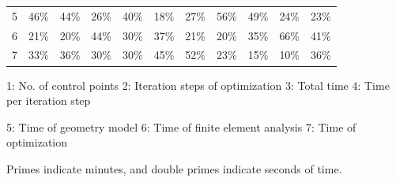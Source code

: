\documentclass[journal]{IEEEtran}
\theoremstyle{definition}
\begin{document}
\begin{table}[!t]
\begin{threeparttable}
\begin{tabular}{ccccccccccc}
      \normalsize{\textcircled{\scriptsize{5}}}\normalsize & 46\%                                & 44\%                                 & 26\%                                  & 40\%                          & 18\%                                 & 27\%                    & 56\%     & 49\%         & 24\%      & 23\%        \\
      \normalsize{\textcircled{\scriptsize{6}}}\normalsize & 21\%                                & 20\%                                 & 44\%                                  & 30\%                          & 37\%                                 & 21\%                    & 20\%     & 35\%         & 66\%      & 41\%        \\
      \normalsize{\textcircled{\scriptsize{7}}}\normalsize & 33\%                                & 36\%                                 & 30\%                                  & 30\%                          & 45\%                                 & 52\%                    & 23\%     & 15\%         & 10\%      & 36\%        \\
      \bottomrule
    \end{tabular}

    \begin{tablenotes}
      \footnotesize
      \item
      \footnotesize{\textcircled{\scriptsize{1}}}\footnotesize: No. of control points
      \footnotesize{\textcircled{\scriptsize{2}}}\footnotesize: Iteration steps of optimization
      \footnotesize{\textcircled{\scriptsize{3}}}\footnotesize: Total time
      \footnotesize{\textcircled{\scriptsize{4}}}\footnotesize: Time per iteration step
      \item
      \footnotesize{\textcircled{\scriptsize{5}}}\footnotesize: Time of geometry model
      \footnotesize{\textcircled{\scriptsize{6}}}\footnotesize: Time of finite element analysis
      \footnotesize{\textcircled{\scriptsize{7}}}\footnotesize: Time of optimization
      \item
      Primes indicate minutes, and double primes indicate seconds of time.
    \end{tablenotes}


  \end{threeparttable}


  \label{computation}
\end{table}
\end{document}
